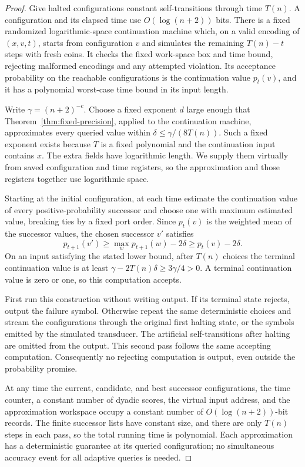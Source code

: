 \begin{proof}
Give halted configurations constant self-transitions through time
$T(n)$. A configuration and its elapsed time use $O(\log(n+2))$
bits. There is a fixed randomized logarithmic-space continuation
machine which, on a valid encoding of $(x,v,t)$, starts from
configuration $v$ and simulates the remaining $T(n)-t$ steps with
fresh coins. It checks the fixed work-space box and time bound,
rejecting malformed encodings and any attempted violation. Its
acceptance probability on the reachable configurations is the
continuation value $p_t(v)$, and it has a
polynomial worst-case time bound in its input length.

Write $\gamma=(n+2)^{-c}$. Choose a fixed exponent $d$ large enough
that Theorem~\ref{thm:fixed-precision}, applied to the continuation
machine, approximates every queried value within
$\delta\le\gamma/(8T(n))$. Such a fixed exponent exists because
$T$ is a fixed polynomial and the continuation input contains $x$.
The extra fields have logarithmic length. We supply them virtually
from saved configuration and time registers, so the approximation
and those registers together use logarithmic space.

Starting at the initial configuration, at each time estimate the
continuation value of every positive-probability successor and
choose one with maximum estimated value, breaking ties by a fixed
port order. Since $p_t(v)$ is the weighted mean of the successor
values, the chosen successor $v'$ satisfies
\[
 p_{t+1}(v')\ge\max_w p_{t+1}(w)-2\delta
                  \ge p_t(v)-2\delta.
\]
On an input satisfying the stated lower bound, after $T(n)$ choices
the terminal continuation value is at least
$\gamma-2T(n)\delta\ge3\gamma/4>0$. A terminal continuation value
is zero or one, so this computation accepts.

First run this construction without writing output. If its terminal
state rejects, output the failure symbol. Otherwise repeat the same
deterministic choices and stream the configurations through the original
first halting state, or the symbols emitted by the simulated transducer.
The artificial self-transitions after halting are omitted from the output.
This second pass follows the same accepting computation. Consequently no rejecting computation
is output, even outside the probability promise.

At any time the current, candidate, and best successor configurations,
the time counter, a constant number of dyadic scores, the virtual
input address, and the approximation workspace occupy a constant
number of $O(\log(n+2))$-bit records. The finite successor lists
have constant size, and there are only $T(n)$ steps in each pass,
so the total running time is polynomial. Each approximation has a
deterministic guarantee at its queried configuration; no simultaneous
accuracy event for all adaptive queries is needed.
\end{proof}
